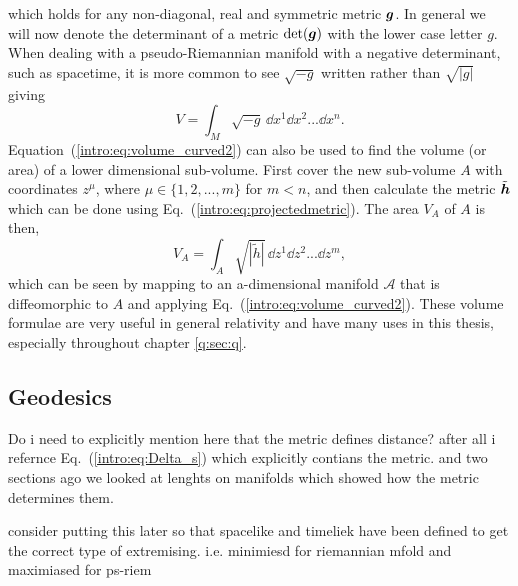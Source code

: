 which holds for any non-diagonal, real and symmetric metric $\boldsymbol{g}$. In general we will now denote the determinant of a metric $\det(\boldsymbol{g})$ with the lower case letter $g$. When dealing with a pseudo-Riemannian manifold with a negative determinant, such as spacetime, it is more common to see $\sqrt{-g}$ written rather than $\sqrt{|g|}$ giving
\begin{equation}
V = \int_{M}\sqrt{-g} \,\dd {x}^1 \dd {x}^2 ... \dd {x}^n.
\end{equation}
Equation~(\ref{intro:eq:volume_curved2}) can also be used to find the volume (or area) of a lower dimensional sub-volume. First cover the new sub-volume $A$ with coordinates $z^\mu$, where $\mu\in\{1,2,...,m\}$ for $m<n$, and then calculate the metric $\tilde{\boldsymbol{h}}$ which can be done using Eq.~(\ref{intro:eq:projectedmetric}). The area $V_A$ of $A$ is then, 
\begin{equation} \label{intro:eq:area_int}
V_A = \int_{A}\sqrt{|\tilde{h}|} \,\dd {z}^1 \dd {z}^2 ... \dd {z}^m,
\end{equation}
which can be seen by mapping to an a-dimensional manifold $\mathcal{A}$ that is diffeomorphic to $A$ and applying Eq.~(\ref{intro:eq:volume_curved2}). These volume formulae are very useful in general relativity and have many uses in this thesis, especially throughout chapter \ref{q:sec:q}.


 \subsection{Geodesics} \label{intro:sec:geodesics}

\color{choral} Do i need to explicitly mention here that the metric defines distance? after all i refernce Eq.~(\ref{intro:eq:Delta_s}) which explicitly contians the metric. and two sections ago we looked at lenghts on manifolds which showed how the metric determines them. \color{black}

\color{gren} consider putting this later so that spacelike and timeliek have been defined to get the correct type of extremising. i.e. minimiesd for riemannian mfold and maximiased for ps-riem \color{black}

